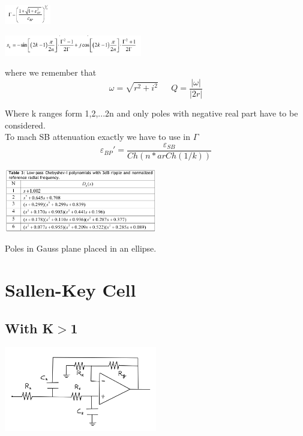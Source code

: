 \centering
\includegraphics[width=0.15\textwidth]{gamma.png}\\
\raggedright


\centering
\includegraphics[width=0.45\textwidth]{s.png}\\
\raggedright

where we remember that 
\begin{equation}
\omega=\sqrt{r^2+i^2} \ \ \ \ \ \ \ Q=\frac{|\omega|}{|2r|}
\end{equation}

Where k ranges form 1,2,...2n and only poles with negative real part have to be considered.\\

To mach SB attenuation exactly we have to use in $\Gamma$
\begin{equation}
\varepsilon_{BP}'=\frac{\varepsilon_{SB}}{Ch(n*arCh(1/k))}
\end{equation}


\centering
\includegraphics[width=0.5\textwidth]{cheby.png}\\
\raggedright

Poles in Gauss plane placed in an ellipse.\\





\section{Sallen-Key Cell}

\subsection{With K$>$1}
\centering
\includegraphics[width=0.5\textwidth]{skg.png}\\
\raggedright

